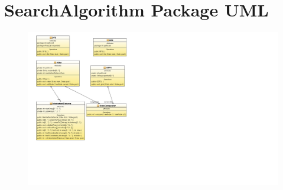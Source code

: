 \documentclass[journal]{IEEEtran}
\begin{document}
\newpage
\section{SearchAlgorithm Package UML}\label{searchAlgorithmUML}
\begin{figure}[h]
\centering
\includegraphics[width=1.6\textwidth,natwidth=610,natheight=642]{../Model/CSM6120_Assignment2-Model/ClassDiagram2.png} 

\end{figure}

\twocolumn




\end{document}
